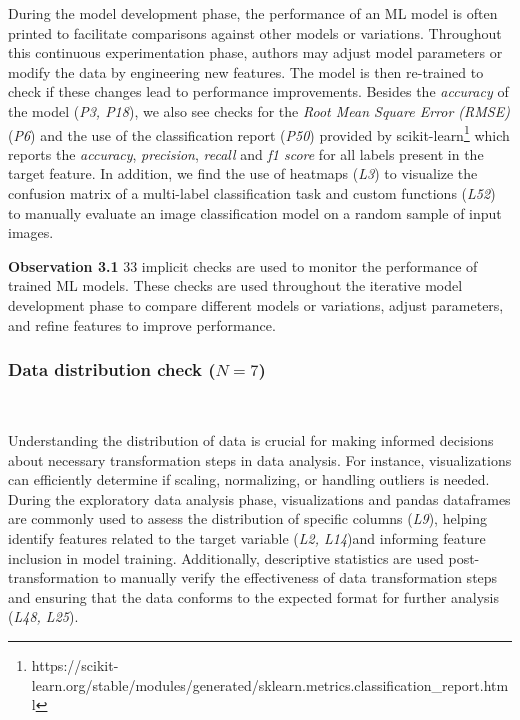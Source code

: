\documentclass[smallextended]{svjour3}       %
\newcommand{\highlight}[1]{\begin{framed}%
  \noindent#1
\end{framed}}
\providecommand{\DIFaddbegin}{} %
\providecommand{\DIFaddend}{} %
\providecommand{\DIFdelbegin}{} %
\providecommand{\DIFdelend}{} %
\newcommand{\DIFscaledelfig}{0.5}
\newlength{\DIFdelgraphicswidth} %
\newlength{\DIFdelgraphicsheight} %
\newcommand{\DIFaddincludegraphics}[2][]{{\color{blue}\fbox{\DIFOincludegraphics[#1]{#2}}}} %
\newcommand{\DIFdelincludegraphics}[2][]{%
\sbox{\DIFdelgraphicsbox}{\DIFOincludegraphics[#1]{#2}}%
\settoboxwidth{\DIFdelgraphicswidth}{\DIFdelgraphicsbox} %
\settoboxtotalheight{\DIFdelgraphicsheight}{\DIFdelgraphicsbox} %
\scalebox{\DIFscaledelfig}{%
\parbox[b]{\DIFdelgraphicswidth}{\usebox{\DIFdelgraphicsbox}\\[-\baselineskip] \rule{\DIFdelgraphicswidth}{0em}}\llap{\resizebox{\DIFdelgraphicswidth}{\DIFdelgraphicsheight}{%
\setlength{\unitlength}{\DIFdelgraphicswidth}%
\begin{picture}(1,1)%
\thicklines\linethickness{2pt} %
{\color[rgb]{1,0,0}\put(0,0){\framebox(1,1){}}}%
{\color[rgb]{1,0,0}\put(0,0){\line( 1,1){1}}}%
{\color[rgb]{1,0,0}\put(0,1){\line(1,-1){1}}}%
\end{picture}%
}\hspace*{3pt}}} %
} %
\DeclareRobustCommand{\DIFaddbegin}{\DIFOaddbegin \let\includegraphics\DIFaddincludegraphics} %
\DeclareRobustCommand{\DIFaddend}{\DIFOaddend \let\includegraphics\DIFOincludegraphics} %
\DeclareRobustCommand{\DIFdelbegin}{\DIFOdelbegin \let\includegraphics\DIFdelincludegraphics} %
\DeclareRobustCommand{\DIFdelend}{\DIFOaddend \let\includegraphics\DIFOincludegraphics} %
\begin{document}
During the model development phase, the performance of an ML model is often printed to facilitate comparisons against other models or variations. Throughout this continuous experimentation phase, authors may adjust model parameters or modify the data by engineering new features. The model is then re-trained to check if these changes lead to performance improvements. Besides the \emph{accuracy} of the model (\emph{P3, P18}), we also see checks for the \emph{Root Mean Square Error (RMSE)} (\emph{P6}) and the use of the classification report (\emph{P50}) provided by scikit-learn\footnote{https://scikit-learn.org/stable/modules/generated/sklearn.metrics.classification\_report.html} which reports the \emph{accuracy}, \emph{precision}, \emph{recall} and \emph{f1 score} for all labels present in the target feature. In addition, we find the use of heatmaps (\emph{L3}) to visualize the confusion matrix of a multi-label classification task and custom functions (\emph{L52}) to manually evaluate an image classification model on a random sample of input images.

\DIFdelbegin %
\DIFdelend \DIFaddbegin \highlight{\textbf{Observation 3.1} 33 implicit checks are used to monitor the performance of trained ML models. These checks are used throughout the iterative model development phase to compare different models or variations, adjust parameters, and refine features to improve performance.}
\DIFaddend 

\subsubsection{Data distribution check ($N = 7$)}~\label{sec:data-distribution-output}

Understanding the distribution of data is crucial for making informed decisions about necessary transformation steps in data analysis. For instance, visualizations can efficiently determine if scaling, normalizing, or handling outliers is needed. During the exploratory data analysis phase, visualizations and pandas dataframes are commonly used to assess the distribution of specific columns (\emph{L9}), helping identify features related to the target variable (\emph{L2, L14})and informing feature inclusion in model training. Additionally, descriptive statistics are used post-transformation to manually verify the effectiveness of data transformation steps and ensuring that the data conforms to the expected format for further analysis (\emph{L48, L25}).
\end{document}

